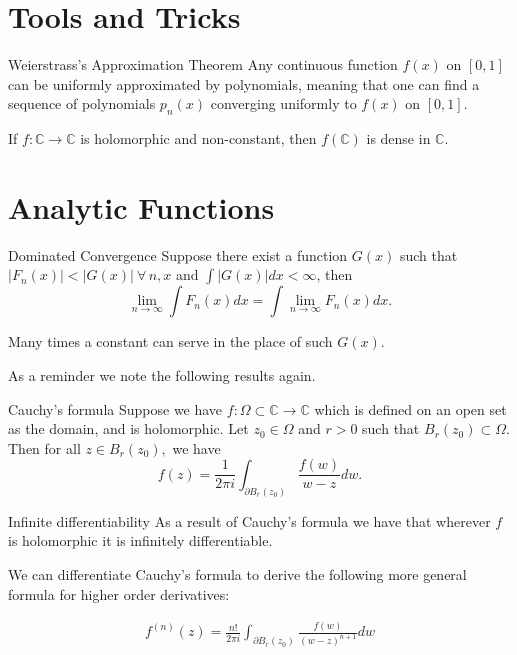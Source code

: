 \documentclass{article}
\begin{document}

\tableofcontents

\newpage

\section{Tools and Tricks}
\begin{thrm}{Weierstrass's Approximation Theorem}{}
Any continuous function \( f(x) \) on \( [0,1] \) can be uniformly approximated by polynomials, meaning that one can find a sequence of polynomials \( p_{n} (x) \) converging uniformly to \( f(x) \) on \( [0,1] \).
\end{thrm}

\begin{thrm}{}{}
If \( f:\mathbb{C} \to \mathbb{C}  \) is holomorphic and non-constant, then \( f(\mathbb{C} ) \) is dense in \( \mathbb{C}  \). 
\end{thrm}


\newpage

\section{Analytic Functions}
\begin{thrm}{Dominated Convergence}{}
Suppose there exist a function \( G(x) \) such that \( \left\lvert F_n(x) \right\rvert < \left\lvert G(x) \right\rvert \ \forall \, n,x \) and \( \int \left\lvert G(x) \right\rvert dx< \infty  \), then
\[
    \lim_{n \to \infty} \int F_{n} (x) dx = \int \lim_{n \to \infty} F_{n} (x) dx.
\]
\end{thrm}  
 Many times a constant can serve in the place of such \( G(x) \).


As a reminder we note the following results again. 
\begin{thrm}{Cauchy's formula}{}   
Suppose we have \( f: \Omega \subset \mathbb{C}  \to \mathbb{C}  \) which is defined on an open set as the domain, and is holomorphic. Let \( z_0 \in \Omega  \) and \( r > 0 \) such that \( B_r(z_0) \subset \Omega  \). Then for all \( z \in B_ r(z_0), \) we have 
\[
    f(z) = \frac{1}{2\pi i}\int _{\partial B_r(z_0)}\frac{f(w)}{w - z}dw. 
\]

\end{thrm}

\begin{cor}{Infinite differentiability}{}
As a result of Cauchy's formula we have that wherever \( f \) is holomorphic it is infinitely differentiable. 

We can differentiate Cauchy's formula to derive the following more general formula for higher order derivatives:

\begin{align*}
    \boxed{f^{(n)}(z) = \frac{n!}{2\pi i}\int _{\partial B_r(z_0) } \frac{f(w)}{(w - z)^{n+ 1} } dw }
\end{align*}

\end{cor}
\end{document}
